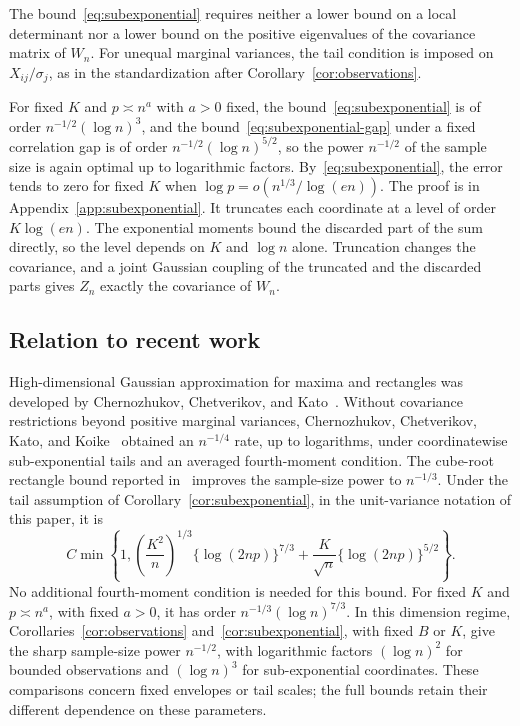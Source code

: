 \documentclass[11pt,letterpaper]{article}
\newif\ifshownat
\newcommand{\nat}[1]{\ifshownat{\color{revblue}%
\hypersetup{linkcolor=revblue,citecolor=revblue,urlcolor=revblue}#1}\else#1\fi}
\newif\ifshowintro
\newcommand{\itx}[1]{\ifshowintro{\color{revblue}%
\hypersetup{linkcolor=revblue,citecolor=revblue,urlcolor=revblue}#1}\else#1\fi}
\theoremstyle{remark}
\begin{document}
\itx{The bound~\eqref{eq:subexponential} requires neither a lower bound on a
local determinant nor a lower bound on the positive eigenvalues of the
covariance matrix of \(W_n\). For unequal marginal variances, the tail
condition is imposed on \(X_{ij}/\sigma_j\), as in the standardization after
Corollary~\ref{cor:observations}.}

\itx{For fixed \(K\) and \(p\asymp n^a\) with \(a>0\) fixed, the
bound~\eqref{eq:subexponential} is of order \(n^{-1/2}(\log n)^3\), and the
bound~\eqref{eq:subexponential-gap} under a fixed correlation gap is of order
\(n^{-1/2}(\log n)^{5/2}\), so the power \(n^{-1/2}\) of the sample size is
again optimal up to logarithmic factors. By~\eqref{eq:subexponential}, the error
tends to zero for fixed \(K\) when \(\log p=o(n^{1/3}/\log(en))\).
The proof is in Appendix~\ref{app:subexponential}. It truncates each coordinate
at a level of order \(K\log(en)\). The exponential moments bound the discarded
part of the sum directly, so the level depends on \(K\) and \(\log n\) alone. Truncation
changes the covariance, and a joint Gaussian coupling of the truncated and the
discarded parts gives \(Z_n\) exactly the covariance of \(W_n\).}

\subsection{Relation to recent work}\label{sec:literature}
High-dimensional Gaussian approximation for maxima and rectangles was
developed by Chernozhukov, Chetverikov, and Kato~\cite{CCK2013,CCK2017}.
Without covariance restrictions beyond positive marginal variances,
Chernozhukov, Chetverikov, Kato, and Koike~\cite[Theorem~2.1]{CCKK2022}
obtained an \(n^{-1/4}\) rate, up to logarithms, under coordinatewise
sub-exponential tails and an averaged fourth-moment condition.
\nat{The cube-root rectangle bound reported in~\cite[Theorem~1 and Section~5]{GaoZhang} improves the sample-size power to \(n^{-1/3}\). Under the tail assumption of Corollary~\ref{cor:subexponential}, in the unit-variance notation of this paper, it is}
\begin{equation*}
 C\min\left\{1,
 \left(\frac{K^2}{n}\right)^{1/3}\{\log(2np)\}^{7/3}
 +\frac K{\sqrt n}\{\log(2np)\}^{5/2}\right\}.
\end{equation*}
No additional fourth-moment condition is needed for this bound.
For fixed \(K\) and \(p\asymp n^a\), with fixed \(a>0\), it has
order \(n^{-1/3}(\log n)^{7/3}\). In this dimension regime,
Corollaries~\ref{cor:observations} and~\ref{cor:subexponential}, with
fixed \(B\) or \(K\), give the sharp sample-size power
\(n^{-1/2}\), with logarithmic factors \((\log n)^2\) for bounded
observations and \((\log n)^3\) for sub-exponential coordinates.
These comparisons concern fixed envelopes or tail scales; the full
bounds retain their different dependence on these parameters.
\end{document}
